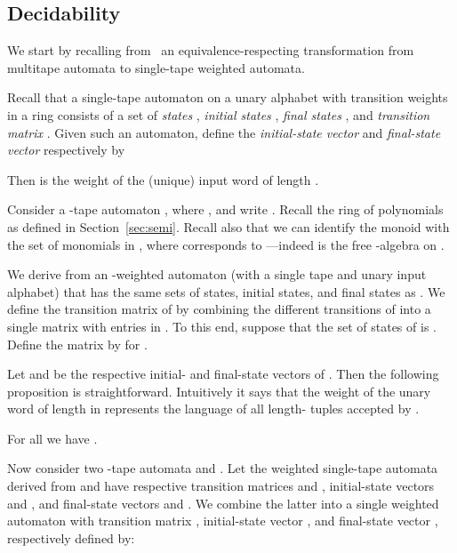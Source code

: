 \documentclass[runningheads]{llncs}
\begin{document}
\subsection{Decidability}
We start by recalling from~\cite{HarjuK91} an equivalence-respecting
transformation from multitape automata to single-tape weighted
automata.  

Recall that a single-tape automaton on a unary alphabet with
transition weights in a ring  consists of a set of \emph{states}
, \emph{initial states} ,
\emph{final states} , and \emph{transition matrix} .  Given such an automaton, define the
\emph{initial-state vector}  and
\emph{final-state vector}  respectively by

Then  is the weight of the (unique) input word of
length .

Consider a -tape automaton ,
where , and write
.  Recall the ring of
polynomials  as
defined in Section~\ref{sec:semi}.  Recall also that we can identify
the monoid  with the set of monomials in , where  corresponds to
---indeed  is the free -algebra on .

We derive from  an -weighted
automaton  (with a single tape and unary input
alphabet) that has the same sets of states, initial states, and final
states as .  We define the transition matrix  of  by
combining the different transitions of  into a single matrix with
entries in .  To this
end, suppose that the set of states of  is .
Define the matrix 
by  for .

Let  and  be the respective initial- and final-state
vectors of .  Then the following proposition is
straightforward.  Intuitively it says that the weight of the unary
word of length  in  represents the language of all
length- tuples accepted by .
\begin{proposition}
For all  we have
.
\label{prop:matrix}
\end{proposition}

Now consider two -tape automata  and .  Let the weighted
single-tape automata derived from  and  have respective
transition matrices  and , initial-state vectors 
and , and final-state vectors  and .  We
combine the latter into a single weighted automaton with transition
matrix , initial-state vector , and final-state vector
, respectively defined by:
\end{document}
